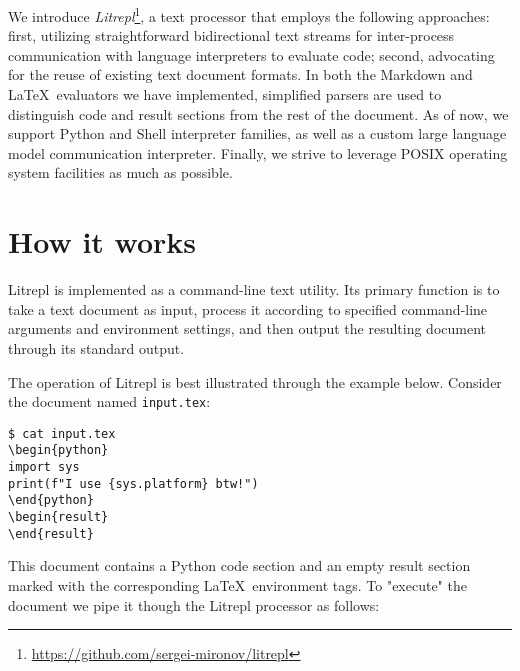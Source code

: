 \documentclass[letterpaper,12pt,twocolumn]{article}
\newcommand{\Latex}{\LaTeX\ }
\begin{document}
We introduce
\textit{Litrepl}\footnote{\url{https://github.com/sergei-mironov/litrepl}},
a text processor that employs the following approaches: first, utilizing
straightforward bidirectional text streams for inter-process communication with
language interpreters to evaluate code; second, advocating for the reuse of
existing text document formats. In both the Markdown and \Latex evaluators we
have implemented, simplified parsers are used to distinguish code and result
sections from the rest of the document.  As of now, we support Python and Shell
interpreter families, as well as a custom large language model communication
interpreter. Finally, we strive to leverage POSIX\cite{POSIX2024} operating
system facilities as much as possible.

\section{How it works}

Litrepl is implemented as a command-line text utility. Its primary function is
to take a text document as input, process it according to specified command-line
arguments and environment settings, and then output the resulting document
through its standard output.

The operation of Litrepl is best illustrated through the example below. Consider
the document named \verb|input.tex|:

\begin{comment}
\begin{sh}
echo '\begin{verbatim}'
echo '$ cat input.tex'
cat input.tex
echo '\end{verbatim}'
\end{sh}
\end{comment}
\begin{verbatim}
$ cat input.tex
\begin{python}
import sys
print(f"I use {sys.platform} btw!")
\end{python}
\begin{result}
\end{result}
\end{verbatim}

This document contains a Python code section and an empty result section marked
with the corresponding \Latex environment tags. To "execute" the document we
pipe it though the Litrepl processor as follows:
\end{document}
